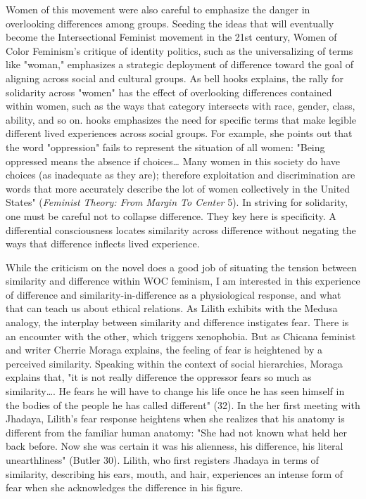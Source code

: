 \documentclass[11pt]{article}
\begin{document}
Women of this movement were also careful to emphasize the danger in
overlooking differences among groups. Seeding the ideas that will
eventually become the Intersectional Feminist movement in the 21st
century, Women of Color Feminism's critique of identity politics, such
as the universalizing of terms like "woman," emphasizes a strategic
deployment of difference toward the goal of aligning across social and
cultural groups. As bell hooks explains, the rally for solidarity
across "women" has the effect of overlooking differences contained
within women, such as the ways that category intersects with race,
gender, class, ability, and so on. hooks emphasizes the need for
specific terms that make legible different lived experiences across
social groups. For example, she points out that the word "oppression"
fails to represent the situation of all women: "Being oppressed means
the absence if choices\ldots{} Many women in this society do have choices
(as inadequate as they are); therefore exploitation and discrimination
are words that more accurately describe the lot of women collectively
in the United States" (\emph{Feminist Theory: From Margin To Center} 5). In
striving for solidarity, one must be careful not to collapse
difference. They key here is specificity. A differential consciousness
locates similarity across difference without negating the ways that
difference inflects lived experience.

While the criticism on the novel does a good job of situating the
tension between similarity and difference within WOC feminism, I am
interested in this experience of difference and
similarity-in-difference as a physiological response, and what that
can teach us about ethical relations. As Lilith exhibits with the
Medusa analogy, the interplay between similarity and difference
instigates fear. There is an encounter with the other, which triggers
xenophobia. But as Chicana feminist and writer Cherrie Moraga
explains, the feeling of fear is heightened by a perceived
similarity. Speaking within the context of social hierarchies, Moraga
explains that, "it is not really difference the oppressor fears so
much as similarity\ldots{}. He fears he will have to change his life once
he has seen himself in the bodies of the people he has called
different" (32). In the her first meeting with Jhadaya, Lilith's fear
response heightens when she realizes that his anatomy is different
from the familiar human anatomy: "She had not known what held her back
before. Now she was certain it was his alienness, his difference, his
literal unearthliness" (Butler 30). Lilith, who first registers
Jhadaya in terms of similarity, describing his ears, mouth, and hair,
experiences an intense form of fear when she acknowledges the
difference in his figure.
\end{document}
